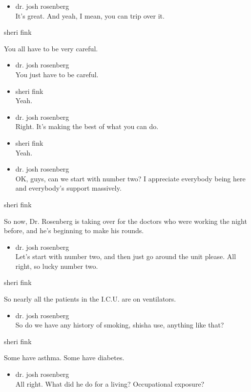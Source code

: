\begin{itemize}
\tightlist
\item
  dr. josh rosenberg\\
  It's great. And yeah, I mean, you can trip over it.
\end{itemize}

sheri fink

You all have to be very careful.

\begin{itemize}
\item
  dr. josh rosenberg\\
  You just have to be careful.
\item
  sheri fink\\
  Yeah.
\item
  dr. josh rosenberg\\
  Right. It's making the best of what you can do.
\item
  sheri fink\\
  Yeah.
\item
  dr. josh rosenberg\\
  OK, guys, can we start with number two? I appreciate everybody being
  here and everybody's support massively.
\end{itemize}

sheri fink

So now, Dr. Rosenberg is taking over for the doctors who were working
the night before, and he's beginning to make his rounds.

\begin{itemize}
\tightlist
\item
  dr. josh rosenberg\\
  Let's start with number two, and then just go around the unit please.
  All right, so lucky number two.
\end{itemize}

sheri fink

So nearly all the patients in the I.C.U. are on ventilators.

\begin{itemize}
\tightlist
\item
  dr. josh rosenberg\\
  So do we have any history of smoking, shisha use, anything like that?
\end{itemize}

sheri fink

Some have asthma. Some have diabetes.

\begin{itemize}
\tightlist
\item
  dr. josh rosenberg\\
  All right. What did he do for a living? Occupational exposure?
\end{itemize}

